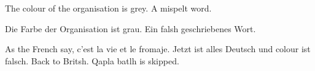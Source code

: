 \documentclass{article}
\begin{document}
The colour of the organisation is grey. A mispelt word.
\begin{otherlanguage}{german}
Die Farbe der Organisation ist grau. Ein falsh geschriebenes Wort.
\end{otherlanguage}
As the French say, \foreignlanguage{french}{c'est la vie et le fromaje}.
Jetzt ist alles Deutsch und colour ist falsch.
Back to Britsh. \foreignlanguage{klingon}{Qapla batlh} is skipped.
\end{document}
